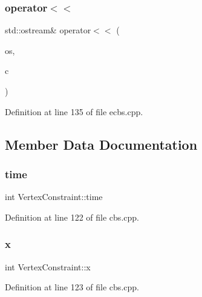 \subsubsection{\texorpdfstring{operator$<$$<$}{operator<<}\hspace{0.1cm}{\footnotesize\ttfamily [2/2]}}
{\footnotesize\ttfamily std\+::ostream\& operator$<$$<$ (\begin{DoxyParamCaption}\item[{std\+::ostream \&}]{os,  }\item[{const \hyperlink{struct_vertex_constraint}{Vertex\+Constraint} \&}]{c }\end{DoxyParamCaption})\hspace{0.3cm}{\ttfamily [friend]}}



Definition at line 135 of file ecbs.\+cpp.



\subsection{Member Data Documentation}
\mbox{\label{struct_vertex_constraint_a524c257a521498f549e35a966c5dc900}} 
\subsubsection{\texorpdfstring{time}{time}}
{\footnotesize\ttfamily int Vertex\+Constraint\+::time}



Definition at line 122 of file cbs.\+cpp.

\mbox{\label{struct_vertex_constraint_a23167b86e213a24d74bb8a15472b862a}} 
\subsubsection{\texorpdfstring{x}{x}}
{\footnotesize\ttfamily int Vertex\+Constraint\+::x}



Definition at line 123 of file cbs.\+cpp.

\mbox{\label{struct_vertex_constraint_a1c20e6282ccaeb862046c483c72ebd98}} 

